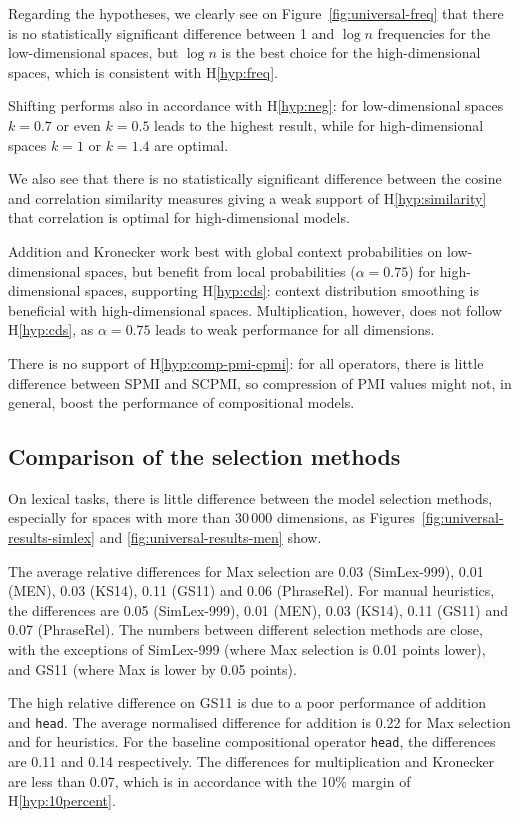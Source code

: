 Regarding the hypotheses, we clearly see on Figure~\ref{fig:universal-freq} that there is no statistically significant difference between 1 and $\log n$ frequencies for the low-dimensional spaces, but $\log n$ is the best choice for the high-dimensional spaces, which is consistent with H\ref{hyp:freq}.

Shifting performs also in accordance with H\ref{hyp:neg}: for low-dimensional spaces $k=0.7$ or even $k=0.5$ leads to the highest result, while for high-dimensional spaces $k=1$ or $k=1.4$ are optimal.

We also see that there is no statistically significant difference between the cosine and correlation similarity measures giving a weak support of H\ref{hyp:similarity} that correlation is optimal for high-dimensional models.

Addition and Kronecker work best with global context probabilities on low-dimensional spaces, but benefit from local probabilities ($\alpha=0.75$) for high-dimensional spaces, supporting H\ref{hyp:cds}: context distribution smoothing is beneficial with high-dimensional spaces. Multiplication, however, does not follow H\ref{hyp:cds}, as $\alpha = 0.75$ leads to weak performance for all dimensions.

There is no support of H\ref{hyp:comp-pmi-cpmi}: for all operators, there is little difference between SPMI and SCPMI, so compression of PMI values might not, in general, boost the performance of compositional models.

\subsection{Comparison of the selection methods}
\label{sec:comparison-universal}

On lexical tasks, there is little difference between the model selection methods, especially for spaces with more than 30\,000 dimensions, as Figures~\ref{fig:universal-results-simlex} and \ref{fig:universal-results-men} show.

The average relative differences for Max selection are 0.03 (SimLex-999), 0.01 (MEN), 0.03 (KS14), 0.11 (GS11) and 0.06 (PhraseRel). For manual heuristics, the differences are 0.05 (SimLex-999), 0.01 (MEN), 0.03 (KS14), 0.11 (GS11) and 0.07 (PhraseRel). The numbers between different selection methods are close, with the exceptions of SimLex-999 (where Max selection is 0.01 points lower), and GS11 (where Max is lower by 0.05 points).

The high relative difference on GS11 is due to a poor performance of addition and \texttt{head}. The average normalised difference for addition is 0.22 for Max selection and for heuristics. For the baseline compositional operator \texttt{head}, the differences are 0.11 and 0.14 respectively. The differences for multiplication and Kronecker are less than 0.07, which is in accordance with the 10\% margin of H\ref{hyp:10percent}.

